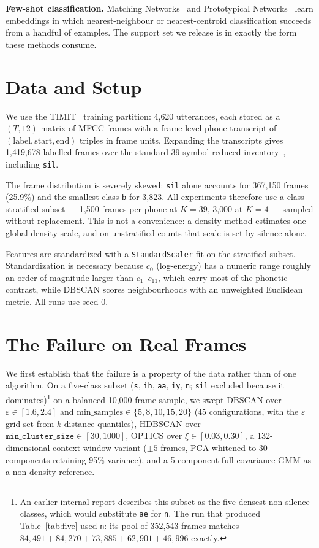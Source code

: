 \documentclass[11pt]{article}
\newcommand{\ph}[1]{\texttt{#1}}
\begin{document}
\textbf{Few-shot classification.} Matching Networks~\cite{vinyals2016} and
Prototypical Networks~\cite{snell2017} learn embeddings in which
nearest-neighbour or nearest-centroid classification succeeds from a handful of
examples. The support set we release is in exactly the form these methods
consume.

\section{Data and Setup}

We use the TIMIT~\cite{garofolo1993} training partition: 4{,}620 utterances,
each stored as a $(T,12)$ matrix of MFCC frames with a frame-level phone
transcript of $(\text{label}, \text{start}, \text{end})$ triples in frame units.
Expanding the transcripts gives 1{,}419{,}678 labelled frames over the standard
39-symbol reduced inventory~\cite{leehon1989}, including \ph{sil}.

The frame distribution is severely skewed: \ph{sil} alone accounts for 367{,}150
frames (25.9\%) and the smallest class \ph{b} for 3{,}823. All experiments
therefore use a class-stratified subset --- 1{,}500 frames per phone at $K=39$,
3{,}000 at $K=4$ --- sampled without replacement. This is not a convenience: a
density method estimates one global density scale, and on unstratified counts
that scale is set by silence alone.

Features are standardized with a \texttt{StandardScaler} fit on the stratified
subset. Standardization is necessary because $c_0$ (log-energy) has a numeric
range roughly an order of magnitude larger than $c_1$--$c_{11}$, which carry most
of the phonetic contrast, while DBSCAN scores neighbourhoods with an unweighted
Euclidean metric. All runs use seed $0$.

\section{The Failure on Real Frames}
\label{sec:baseline}

We first establish that the failure is a property of the data rather than of one
algorithm. On a five-class subset (\ph{s}, \ph{ih}, \ph{aa}, \ph{iy}, \ph{n};
\ph{sil} excluded because it dominates)\footnote{An earlier internal report
describes this subset as the five densest non-silence classes, which would
substitute \ph{ae} for \ph{n}. The run that produced Table~\ref{tab:five} used
\ph{n}: its pool of 352{,}543 frames matches
$84{,}491 + 84{,}270 + 73{,}885 + 62{,}901 + 46{,}996$ exactly.}
on a balanced 10{,}000-frame sample, we swept DBSCAN over
$\varepsilon \in [1.6,2.4]$ and $\mathrm{min\_samples} \in \{5,8,10,15,20\}$
(45 configurations, with the $\varepsilon$ grid set from $k$-distance
quantiles), HDBSCAN over $\texttt{min\_cluster\_size} \in [30,1000]$, OPTICS
over $\xi \in [0.03,0.30]$, a 132-dimensional context-window variant ($\pm5$
frames, PCA-whitened to 30 components retaining 95\% variance), and a
5-component full-covariance GMM as a non-density reference.
\end{document}
